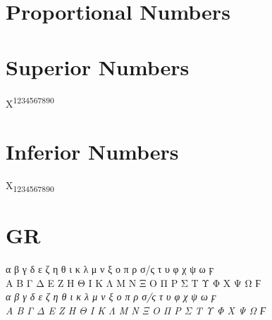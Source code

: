 \documentclass[a4paper]{article}
\begin{document}

\section*{Proportional Numbers}


\section*{Superior Numbers}

X\textsuperscript{1234567890}

\section*{Inferior Numbers}

X\textsubscript{1234567890}

\section*{GR}

 α β γ δ ε ζ η θ ι κ λ μ ν ξ ο π ρ σ/ς τ υ φ χ ψ ω ϝ \\
 Α Β Γ Δ Ε Ζ Η Θ Ι Κ Λ Μ Ν Ξ Ο Π Ρ Σ Τ Υ Φ Χ Ψ Ω Ϝ\\
\emph{ α β γ δ ε ζ η θ ι κ λ μ ν ξ ο π ρ σ/ς τ υ φ χ ψ ω ϝ\\
 Α Β Γ Δ Ε Ζ Η Θ Ι Κ Λ Μ Ν Ξ Ο Π Ρ Σ Τ Υ Φ Χ Ψ Ω Ϝ}\par
 
\end{document}
